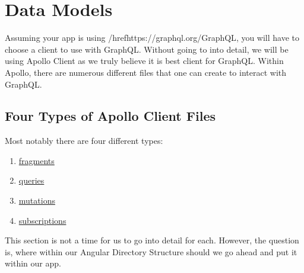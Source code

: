 \section{ Data Models }
\maketitle{}

Assuming your app is using /href{https://graphql.org/}{GraphQL}, you will have
to choose a client to use with GraphQL. Without going to into detail, we will be
using Apollo Client as we truly believe it is best client for GraphQL. Within
Apollo, there are numerous different files that one can create to interact
with GraphQL.

\subsection{Four Types of Apollo Client Files}
Most notably there are four different types:
\begin{enumerate}
  \item \href{https://www.apollographql.com/docs/angular/features/fragments}{fragments}
  \item \href{https://www.apollographql.com/docs/angular/basics/queries/}{queries}
  \item \href{https://www.apollographql.com/docs/angular/basics/mutations}{mutations}
  \item \href{https://www.apollographql.com/docs/angular/features/subscriptions}{subscriptions}
\end{enumerate}

This section is not a time for us to go into detail for each. However, the
question is, where within our Angular Directory Structure should we go ahead and
put it within our app.
